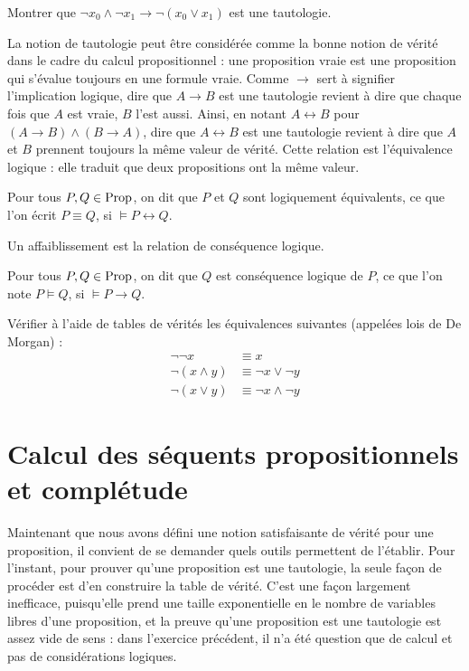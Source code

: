 \begin{exercise}
  Montrer que $\lnot x_0\land \lnot x_1 \to \lnot (x_0\lor x_1)$ est une
  tautologie.
\end{exercise}

La notion de tautologie peut être considérée comme la bonne notion de vérité
dans le cadre du calcul propositionnel : une proposition vraie est une
proposition qui s'évalue toujours en une formule vraie. Comme $\to$ sert à
signifier l'implication logique, dire que $A \to B$ est une tautologie revient à
dire que chaque fois que $A$ est vraie, $B$ l'est aussi. Ainsi, en notant
$A \leftrightarrow B$ pour $(A \to B) \land (B \to A)$, dire que
$A \leftrightarrow B$ est une tautologie revient à dire que $A$ et $B$ prennent
toujours la même valeur de vérité. Cette relation est l'équivalence logique :
elle traduit que deux propositions ont la même valeur.

\begin{definition}
  Pour tous $P,Q\in\operatorname{Prop}$, on dit que $P$ et $Q$ sont logiquement équivalents,
  ce que l'on écrit $P\equiv Q$, si $\models P \leftrightarrow Q$.
\end{definition}

Un affaiblissement est la relation de conséquence logique.

\begin{definition}
  Pour tous $P,Q\in\operatorname{Prop}$, on dit que $Q$ est conséquence logique de $P$, ce que
  l'on note $P\vDash Q$, si $\models P\to Q$.
\end{definition}

\begin{exercise}
  Vérifier à l'aide de tables de vérités les équivalences suivantes (appelées
  lois de De Morgan) :
  \begin{align*}
    \lnot\lnot x &\equiv x\\
    \lnot (x \land y) &\equiv \lnot x \lor \lnot y\\
    \lnot (x \lor y) &\equiv \lnot x \land \lnot y
  \end{align*}
\end{exercise}

\section[Séquents propositionnels]{Calcul des séquents propositionnels et
  complétude}

Maintenant que nous avons défini une notion satisfaisante de vérité pour une
proposition, il convient de se demander quels outils permettent de l'établir.
Pour l'instant, pour prouver qu'une proposition est une tautologie, la seule
façon de procéder est d'en construire la table de vérité. C'est une façon
largement inefficace, puisqu'elle prend une taille exponentielle en le nombre de
variables libres d'une proposition, et la preuve qu'une proposition est une
tautologie est assez vide de sens : dans l'exercice précédent, il n'a été
question que de calcul et pas de considérations logiques.

